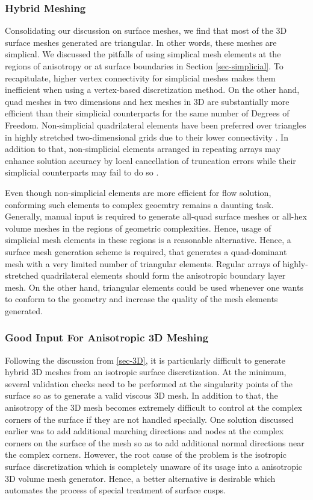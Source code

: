 \subsubsection{Hybrid Meshing}
Consolidating our discussion on surface meshes, we find that most of the 3D surface meshes generated are triangular. In other words, these meshes are simplical. We discussed the pitfalls of using simplical mesh elements at the regions of anisotropy or at surface boundaries in Section \ref{sec-simplicial}. To recapitulate, higher vertex connectivity for simplicial meshes makes them inefficient when using a vertex-based discretization method. On the other hand, quad meshes in two dimensions and hex meshes in 3D are substantially more efficient than their simplicial counterparts for the same number of Degrees of Freedom. Non-simplicial quadrilateral elements have been preferred over triangles in highly stretched two-dimensional grids due to their lower connectivity \cite{aftosmis1994accuracy}. In addition to that, non-simplicial elements arranged in repeating arrays may enhance solution accuracy by local cancellation of truncation errors while their simplicial counterparts may fail to do so \cite{mavriplis1997unstructured}.

Even though non-simplicial elements are more efficient for flow solution, conforming such elements to complex geoemtry remains a daunting task. Generally, manual input is required to generate all-quad surface meshes or all-hex volume meshes in the regions of geometric complexities. Hence, usage of simplicial mesh elements in these regions is a reasonable alternative. Hence, a surface mesh generation scheme is required, that generates a quad-dominant mesh with a very limited number of triangular elements. Regular arrays of highly-stretched quadrilateral elements should form the anisotropic boundary layer mesh. On the other hand, triangular elements could be used whenever one wants to conform to the geometry and increase the quality of the mesh elements generated.

\subsubsection{Good Input For Anisotropic 3D Meshing}
Following the discussion from \ref{sec-3D}, it is particularly difficult to generate  hybrid 3D meshes from an isotropic surface discretization. At the minimum, several validation checks need to be performed at the singularity points of the surface so as to generate a valid viscous 3D mesh. In addition to that, the anisotropy of the 3D mesh becomes extremely difficult to control at the complex corners of the surface if they are not handled specially. One solution discussed earlier was to add additional marching directions and nodes at the complex corners on the surface of the mesh so as to add additional normal directions near the complex corners. However, the root cause of the problem is the isotropic surface discretization which is completely unaware of its usage into a anisotropic 3D volume mesh generator. Hence, a better alternative is desirable which automates the process of special treatment of surface cusps.

